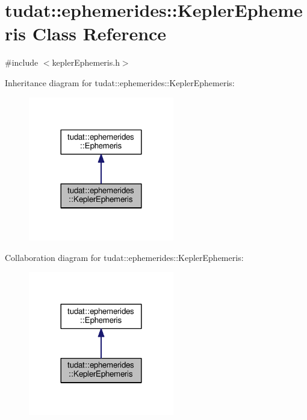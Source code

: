 \hypertarget{classtudat_1_1ephemerides_1_1KeplerEphemeris}{}\section{tudat\+:\+:ephemerides\+:\+:Kepler\+Ephemeris Class Reference}
\label{classtudat_1_1ephemerides_1_1KeplerEphemeris}


{\ttfamily \#include $<$kepler\+Ephemeris.\+h$>$}



Inheritance diagram for tudat\+:\+:ephemerides\+:\+:Kepler\+Ephemeris\+:
\nopagebreak
\begin{figure}[H]
\begin{center}
\leavevmode
\includegraphics[width=180pt]{classtudat_1_1ephemerides_1_1KeplerEphemeris__inherit__graph}
\end{center}
\end{figure}


Collaboration diagram for tudat\+:\+:ephemerides\+:\+:Kepler\+Ephemeris\+:
\nopagebreak
\begin{figure}[H]
\begin{center}
\leavevmode
\includegraphics[width=180pt]{classtudat_1_1ephemerides_1_1KeplerEphemeris__coll__graph}
\end{center}
\end{figure}
